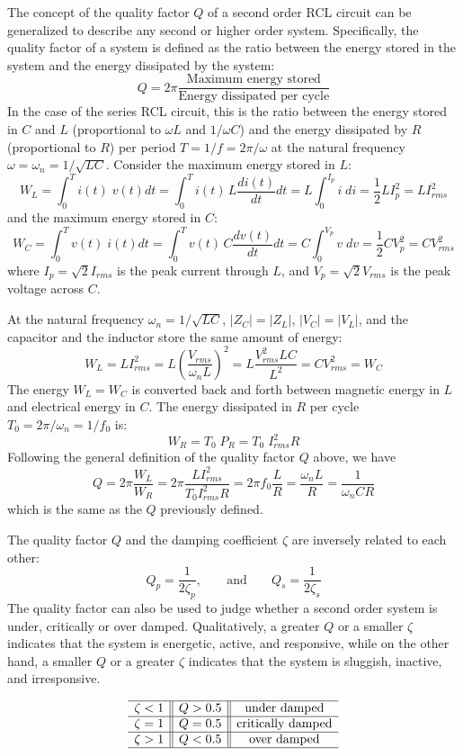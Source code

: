 The concept of the quality factor $Q$ of a second order RCL circuit 
can be generalized to describe any second or higher order system. 
Specifically, the quality factor of a system is defined as the ratio
between the energy stored in the system and the energy dissipated by 
the system:
\[
Q=2\pi\frac{\mbox{Maximum energy stored}}{\mbox{Energy dissipated per cycle}}
\]
In the case of the series RCL circuit, this is the ratio between 
the energy stored in $C$ and $L$ (proportional to $\omega L$ and 
$1/\omega C$) and the energy dissipated by $R$ (proportional to
$R$) per period $T=1/f=2\pi/\omega$ at the natural frequency 
$\omega=\omega_n=1/\sqrt{LC}$. Consider the maximum energy stored
in $L$:
\[	
W_L=\int_0^T i(t)\; v(t) dt=\int_0^T i(t) \,L \frac{di(t)}{dt} dt
=L \int_0^{I_p} i \;di=\frac{1}{2}LI_p^2=LI^2_{rms}	
\]
and the maximum energy stored in $C$:
\[
W_C=\int_0^T v(t)\; i(t) dt=\int_0^T v(t) \,C \frac{dv(t)}{dt} dt
=C \int_0^{V_p} v \;dv=\frac{1}{2}CV_p^2=CV^2_{rms}	
\]
where $I_p=\sqrt{2}I_{rms}$ is the peak current through $L$, and
$V_p=\sqrt{2}V_{rms}$ is the peak voltage across $C$. 

At the natural frequency $\omega_n=1/\sqrt{LC}$, $|Z_C|=|Z_L|$, 
$|V_C|=|V_L|$, and the capacitor and the inductor store the same 
amount of energy:
\[
W_L=LI^2_{rms}=L \left( \frac{V_{rms}}{\omega_nL}\right)^2
=L\frac{V^2_{rms}LC}{L^2}=CV^2_{rms}=W_C 
\]
The energy $W_L=W_C$ is converted back and forth between magnetic 
energy in $L$ and electrical energy in $C$. The energy dissipated 
in $R$ per cycle $T_0=2\pi/\omega_n=1/f_0$ is:
\[
W_R=T_0\;P_R = T_0\;I^2_{rms} R 
\]
Following the general definition of the quality factor $Q$ above,
we have
\[
Q=2\pi\frac{W_L}{W_R}=2\pi\frac{LI^2_{rms}}{T_0I^2_{rms}R }
=2\pi f_0\frac{L}{R}=\frac{\omega_nL}{R}=\frac{1}{\omega_nCR}
\]
which is the same as the $Q$ previously defined.

The quality factor $Q$ and the damping coefficient $\zeta$ are inversely
related to each other:
\[
Q_p=\frac{1}{2\zeta_p},\;\;\;\;\;\;\;\mbox{and}\;\;\;\;\;\;\;
Q_s=\frac{1}{2\zeta_s}
\]
The quality factor can also be used to judge whether a second order system 
is under, critically or over damped. Qualitatively, a greater $Q$ or a smaller
$\zeta$ indicates that the system is energetic, active, and responsive, while 
on the other hand, a smaller $Q$ or a greater $\zeta$ indicates that the
system is sluggish, inactive, and irresponsive. 

\[
\begin{array}{c||c||c} \hline 
\zeta<1 & Q>0.5 & \mbox{under damped} \\\hline
\zeta=1 & Q=0.5 & \mbox{critically damped} \\\hline
\zeta>1 & Q<0.5 & \mbox{over damped} \\ \hline
\end{array}
\]

